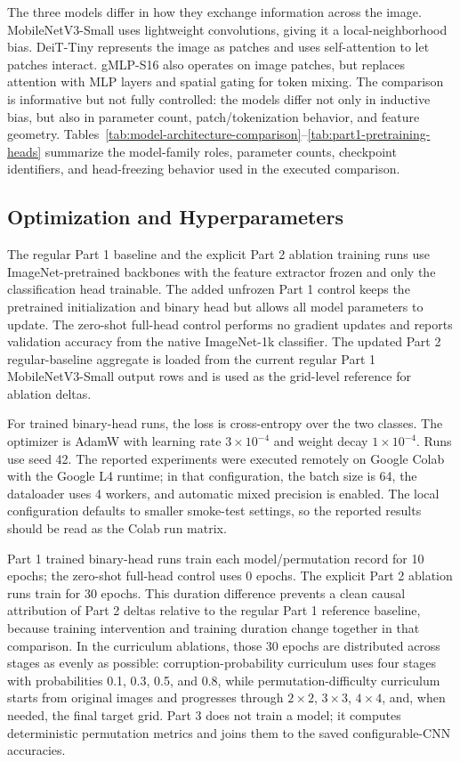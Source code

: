 \documentclass[12pt]{article}
\begin{document}
The three models differ in how they exchange information across the image. MobileNetV3-Small uses lightweight convolutions, giving it a local-neighborhood bias. DeiT-Tiny represents the image as patches and uses self-attention to let patches interact. gMLP-S16 also operates on image patches, but replaces attention with MLP layers and spatial gating for token mixing. The comparison is informative but not fully controlled: the models differ not only in inductive bias, but also in parameter count, patch/tokenization behavior, and feature geometry. Tables~\ref{tab:model-architecture-comparison}--\ref{tab:part1-pretraining-heads} summarize the model-family roles, parameter counts, checkpoint identifiers, and head-freezing behavior used in the executed comparison.

\subsection{Optimization and Hyperparameters}

The regular Part 1 baseline and the explicit Part 2 ablation training runs use ImageNet-pretrained backbones with the feature extractor frozen and only the classification head trainable. The added unfrozen Part 1 control keeps the pretrained initialization and binary head but allows all model parameters to update. The zero-shot full-head control performs no gradient updates and reports validation accuracy from the native ImageNet-1k classifier. The updated Part 2 regular-baseline aggregate is loaded from the current regular Part 1 MobileNetV3-Small output rows and is used as the grid-level reference for ablation deltas.

For trained binary-head runs, the loss is cross-entropy over the two classes. The optimizer is AdamW with learning rate $3 \times 10^{-4}$ and weight decay $1 \times 10^{-4}$. Runs use seed 42. The reported experiments were executed remotely on Google Colab with the Google L4 runtime; in that configuration, the batch size is 64, the dataloader uses 4 workers, and automatic mixed precision is enabled. The local configuration defaults to smaller smoke-test settings, so the reported results should be read as the Colab run matrix.

Part 1 trained binary-head runs train each model/permutation record for 10 epochs; the zero-shot full-head control uses 0 epochs. The explicit Part 2 ablation runs train for 30 epochs. This duration difference prevents a clean causal attribution of Part 2 deltas relative to the regular Part 1 reference baseline, because training intervention and training duration change together in that comparison. In the curriculum ablations, those 30 epochs are distributed across stages as evenly as possible: corruption-probability curriculum uses four stages with probabilities 0.1, 0.3, 0.5, and 0.8, while permutation-difficulty curriculum starts from original images and progresses through $2 \times 2$, $3 \times 3$, $4 \times 4$, and, when needed, the final target grid. Part 3 does not train a model; it computes deterministic permutation metrics and joins them to the saved configurable-CNN accuracies.
\end{document}

